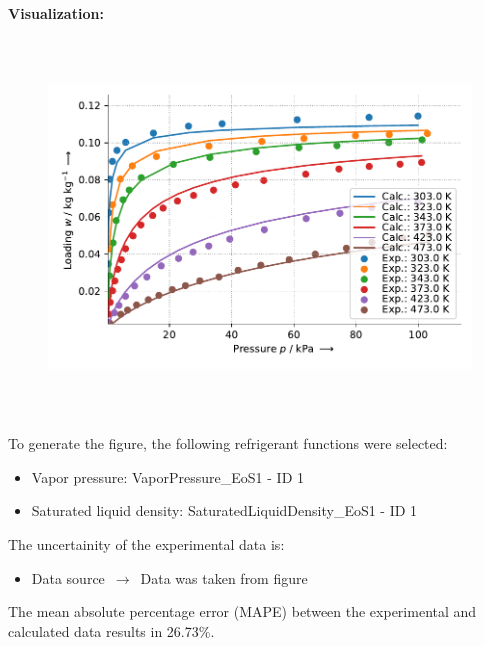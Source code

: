\textbf{Visualization:}
%
\begin{figure}[!htp]
{\noindent\includegraphics[height=10cm, keepaspectratio]{figs/ads/ads_Propylene_zeolite_pellet_13X_Toth_1.pdf}}
\end{figure}
%

To generate the figure, the following refrigerant functions were selected:
\begin{itemize}
\item Vapor pressure: VaporPressure\_EoS1 - ID 1
\item Saturated liquid density: SaturatedLiquidDensity\_EoS1 - ID 1
\end{itemize}

The uncertainity of the experimental data is:
\begin{itemize}
\item Data source $\,\to\,$ Data was taken from figure
\end{itemize}

The mean absolute percentage error (MAPE) between the experimental and calculated data results in 26.73\%.
\FloatBarrier
\newpage
